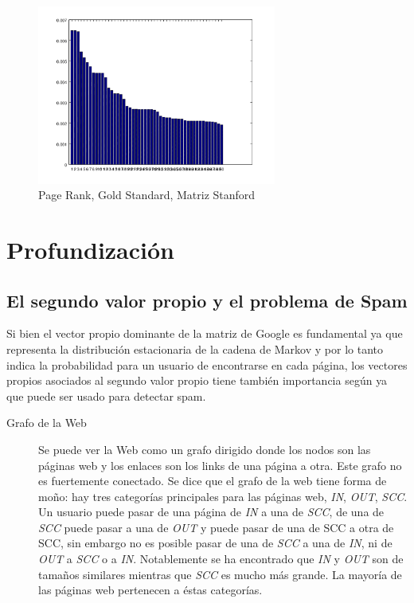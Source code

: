 \documentclass{article}
\begin{document}
\begin{figure}[p]
\label{fig:PRST}
  \caption{Page Rank, Gold Standard, Matriz Stanford}
  \centering
    \includegraphics[width=0.7\textwidth]{PageRank-GoldStandard-Stanford.png}
\end{figure}



\section{Profundización}

\subsection{El segundo valor propio y el problema de Spam}

Si bien el vector propio dominante de la matriz de Google es fundamental ya que representa la distribución estacionaria de la cadena de Markov y por lo tanto indica la probabilidad para un usuario de encontrarse en cada página, los vectores propios asociados al segundo valor propio tiene también importancia según \cite{Sangers2015192} ya que puede ser usado para detectar spam.

\begin{description}
\item[Grafo de la Web]  Se puede ver la Web como un grafo dirigido donde los nodos son las páginas web y los enlaces son los links de una página a otra. Este grafo no es fuertemente conectado. Se dice que el grafo de la web tiene forma de moño: hay tres categorías principales para las páginas web, \textit{IN}, \textit{OUT}, \textit{SCC}. Un usuario puede pasar de una página de \textit{IN} a una de \textit{SCC}, de una de\textit{ SCC} puede pasar a una de \textit{OUT} y puede pasar de una de SCC a otra de SCC, sin embargo no es posible pasar de una de \textit{SCC} a una de \textit{IN}, ni de \textit{OUT} a\textit{ SCC} o a \textit{IN}. Notablemente se ha encontrado que \textit{IN} y \textit{OUT} son de tamaños similares mientras que \textit{SCC} es mucho más grande. La mayoría de las páginas web pertenecen a éstas categorías. \cite{stanfordWebgraph} \cite{Broder2000309}
\end{description}
\end{document}
